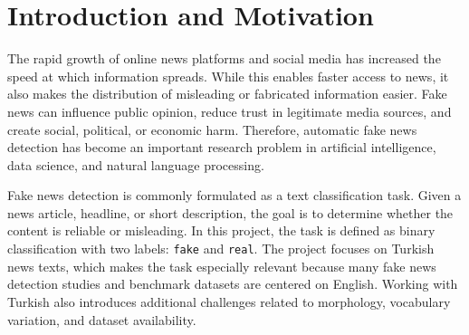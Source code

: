 \documentclass[11pt]{article}
\begin{document}
\clearpage
{}

\begin{abstract}
This project investigates fake news detection as a supervised binary text classification task on a Turkish-language news dataset. The main objective is to compare a traditional lexical representation method, TF-IDF, with transformer-based sentence embeddings for distinguishing between fake and real news. In the baseline approach, TF-IDF vectors were extracted from news texts and classified using Logistic Regression. In the embedding-based approach, dense sentence representations were generated with the multilingual Sentence-BERT model , and two classical classifiers, Logistic Regression and Support Vector Machine (SVM), were trained on these representations. The models were evaluated using accuracy, precision, recall, F1-score, and confusion matrices on a fixed stratified test set. The experimental results show that TF-IDF + Logistic Regression achieved the highest overall performance with an accuracy of 0.9381 and an F1-score of 0.9317. Although transformer-based embeddings produced competitive results, the TF-IDF baseline performed better in this experimental setup. This suggests that lexical patterns in the selected dataset were highly informative for fake news classification.
\end{abstract}

\section{Introduction and Motivation}

The rapid growth of online news platforms and social media has increased the speed at which information spreads. While this enables faster access to news, it also makes the distribution of misleading or fabricated information easier. Fake news can influence public opinion, reduce trust in legitimate media sources, and create social, political, or economic harm. Therefore, automatic fake news detection has become an important research problem in artificial intelligence, data science, and natural language processing.

Fake news detection is commonly formulated as a text classification task. Given a news article, headline, or short description, the goal is to determine whether the content is reliable or misleading. In this project, the task is defined as binary classification with two labels: \texttt{fake} and \texttt{real}. The project focuses on Turkish news texts, which makes the task especially relevant because many fake news detection studies and benchmark datasets are centered on English. Working with Turkish also introduces additional challenges related to morphology, vocabulary variation, and dataset availability.
\end{document}
